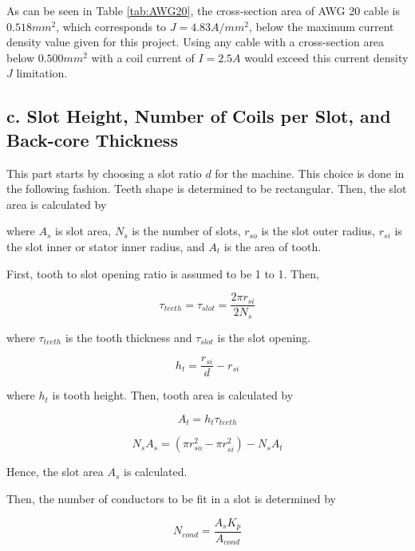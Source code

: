 \documentclass[a4paper, 11pt, titlepage]{article}
\begin{document}
As can be seen in Table \ref{tab:AWG20}, the cross-section area of AWG 20 cable is $0.518mm^2$, which corresponds to $J=4.83A/mm^2$, below the maximum current density value given for this project. Using any cable with a cross-section area below $0.500mm^2$ with a coil current of $I=2.5A$ would exceed this current density $J$ limitation.


\subsection{c. Slot Height, Number of Coils per Slot, and Back-core Thickness}

This part starts by choosing a slot ratio $d$ for the machine. This choice is done in the following fashion. Teeth shape is determined to be rectangular. Then, the slot area is calculated by



where $A_s$ is slot area, $N_s$ is the number of slots, $r_{so}$ is the slot outer radius, $r_{si}$ is the slot inner or stator inner radius, and $A_t$ is the area of tooth.

First, tooth to slot opening ratio is assumed to be 1 to 1. Then, 

\begin{equation}
	\tau_{teeth} = \tau_{slot} = \frac{2\pi r_{si}}{2N_s}
\end{equation}

where $\tau_{teeth}$ is the tooth thickness and $\tau_{slot}$ is the slot opening. 

\begin{equation}
	h_t = \frac{r_{si}}{d}-r_{si}
\end{equation}

where $h_t$ is tooth height. Then, tooth area is calculated by

\begin{equation}
	A_t = h_t \tau_{teeth}
\end{equation}

\begin{equation}
	N_sA_s = (\pi r_{so}^2 - \pi r_{si}^2)-N_sA_t
\end{equation}

Hence, the slot area $A_s$ is calculated.

Then, the number of conductors to be fit in a slot is determined by

\begin{equation}
	N_{cond} = \frac{A_sK_p}{A_{cond}}
	\label{eq:numberOfConductorsPerSlot}
\end{equation}
\end{document}
